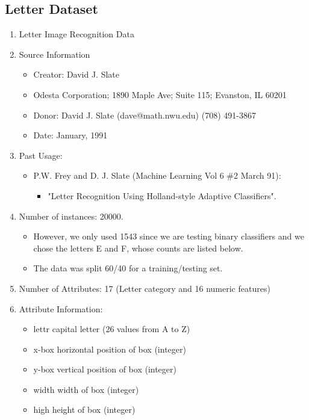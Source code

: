 \documentclass[letterpaper, 11pt]{article}
\begin{document}
\subsection{Letter Dataset}
\begin{enumerate}
    \item Letter Image Recognition Data
    \item Source Information
    \begin{itemize}
        \item Creator: David J. Slate
        \item Odesta Corporation; 1890 Maple Ave; Suite 115; Evanston, IL 60201
        \item Donor: David J. Slate (dave@math.nwu.edu) (708) 491-3867
        \item Date: January, 1991
    \end{itemize}
    \item Past Usage:
    \begin{itemize}
        \item P.W. Frey and D. J. Slate (Machine Learning Vol 6 \#2 March 91):
        \begin{itemize}
            \item "Letter Recognition Using Holland-style Adaptive Classifiers".
        \end{itemize}
    \end{itemize}
    \item Number of instances: 20000.
    \begin{itemize}
        \item However, we only used 1543 since we are testing binary classifiers and we chose the letters E and F, whose counts are listed below.
        \item The data was split 60/40 for a training/testing set.
    \end{itemize}
    \item Number of Attributes: 17 (Letter category and 16 numeric features)
    \item Attribute Information:
    \begin{itemize}
        \item lettr	capital letter	(26 values from A to Z)
        \item x-box	horizontal position of box	  (integer)
        \item y-box	vertical position of box	  (integer)
        \item width	width of box			      (integer)
        \item high 	height of box			      (integer)

\end{itemize}
\end{enumerate}
\end{document}
